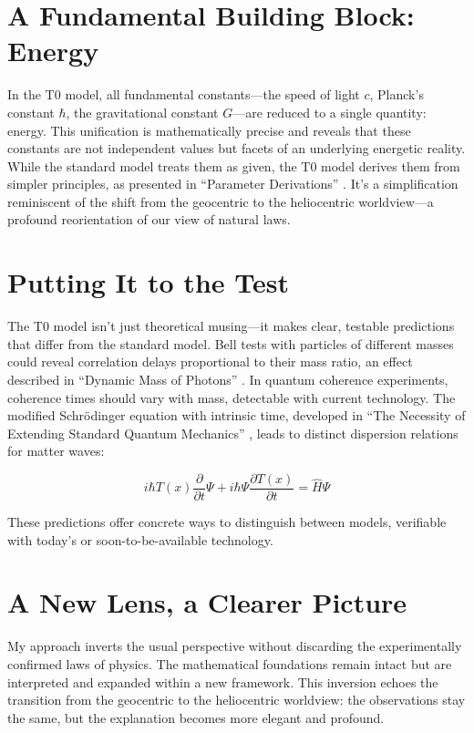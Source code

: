 \documentclass[a4paper,12pt]{article}
\newcommand{\Tfield}{T(x)}
\begin{document}
	\section{A Fundamental Building Block: Energy}
	
	In the T0 model, all fundamental constants—the speed of light \(c\), Planck’s constant \(\hbar\), the gravitational constant \(G\)—are reduced to a single quantity: energy. This unification is mathematically precise and reveals that these constants are not independent values but facets of an underlying energetic reality. While the standard model treats them as given, the T0 model derives them from simpler principles, as presented in “Parameter Derivations” \cite{pascher_params_2025}. It’s a simplification reminiscent of the shift from the geocentric to the heliocentric worldview—a profound reorientation of our view of natural laws.
	
	\section{Putting It to the Test}
	
	The T0 model isn’t just theoretical musing—it makes clear, testable predictions that differ from the standard model. Bell tests with particles of different masses could reveal correlation delays proportional to their mass ratio, an effect described in “Dynamic Mass of Photons” \cite{pascher_photons_2025}. In quantum coherence experiments, coherence times should vary with mass, detectable with current technology. The modified Schrödinger equation with intrinsic time, developed in “The Necessity of Extending Standard Quantum Mechanics” \cite{pascher_quantum_2025}, leads to distinct dispersion relations for matter waves:
	
	\begin{equation}
		i\hbar \Tfield \frac{\partial}{\partial t} \Psi + i\hbar \Psi \frac{\partial \Tfield}{\partial t} = \hat{H} \Psi
	\end{equation}
	
	These predictions offer concrete ways to distinguish between models, verifiable with today’s or soon-to-be-available technology.
	
	\section{A New Lens, a Clearer Picture}
	
	My approach inverts the usual perspective without discarding the experimentally confirmed laws of physics. The mathematical foundations remain intact but are interpreted and expanded within a new framework. This inversion echoes the transition from the geocentric to the heliocentric worldview: the observations stay the same, but the explanation becomes more elegant and profound.
	
\end{document}
